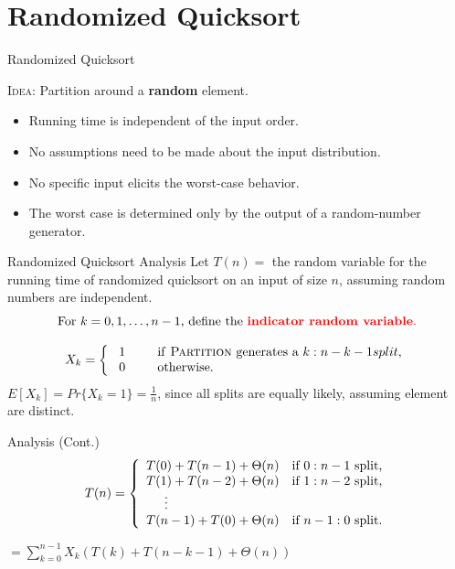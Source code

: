 \documentclass{beamer}
\begin{document}
\section{Randomized Quicksort}

\begin{frame}{Randomized Quicksort}
    \begin{alertblock}{\textsc{Idea:}}
        Partition around a \textbf{random} element.
    \end{alertblock}
    \begin{itemize}
        \item Running time is independent of the input order.
        \item No assumptions need to be made about the input distribution.
        \item No specific input elicits the worst-case behavior.
        \item The worst case is determined only by the output of a random-number generator.
    \end{itemize}
\end{frame}

\begin{frame}{Randomized Quicksort Analysis}
    Let $T(n) = $ the random variable for the running time of randomized quicksort on an input of size $n$, assuming random numbers are independent.
    $$
        \text{For } k = 0, 1, \ldots, n - 1\text{, define the \textcolor{red}{\textbf{indicator random variable}.}}
    $$

    $$
        X_k = \left\{
            \begin{array}{l l}
                \text{ 1 \text{\hspace{3mm}}} & \text{ if \textsc{Partition} generates a } k: n-k-1 split\text{,} \\
                \text{ 0 \text{\hspace{3mm}}} & \text{ otherwise.} \\
            \end{array}
        \right.
    $$
$E[X_k] = Pr\{X_k = 1\} = \frac{1}{n}$, since all splits are equally likely, assuming element are distinct.
\end{frame}

\begin{frame}{Analysis (Cont.)}
    $$
        T(n) = \left\{
            \begin{array}{l l}
                T(0) + T(n - 1) + \Theta(n) & \text{if } 0 : n - 1 \text{ split,} \\
                T(1) + T(n - 2) + \Theta(n) & \text{if } 1 : n - 2 \text{ split,} \\
                \text{\hspace{5mm}} \vdots & \\
                T(n - 1) + T(0) + \Theta(n) & \text{if } n - 1 : 0 \text{ split.} \\
            \end{array}
        \right.
    $$

    \vspace{10mm}
    \centering
    \Large
    $= \sum\limits_{k=0}^{n-1} X_k(T(k) + T(n - k - 1) + \Theta(n))$
\end{frame}
\end{document}
